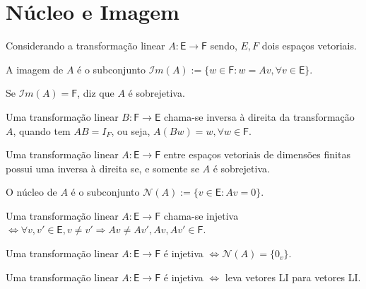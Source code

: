 \documentclass[10pt,a4paper]{article}
\begin{document}
\section{Núcleo e Imagem}

Considerando a transformação linear $A: \textsf{E} \rightarrow \textsf{F}$ sendo, $E, F$ dois espaços vetoriais.

\begin{definition}
	A imagem de $A$ é o subconjunto $\mathcal{I}m(A)  := \{ w \in \textsf{F} : w = Av, \forall v \in \textsf{E}\}$.
\end{definition}


\begin{definition}
	Se $\mathcal{I}m(A) = \textsf{F}$, diz que $A$ é sobrejetiva.
\end{definition}


\begin{definition}
	Uma transformação linear $B: \textsf{F} \rightarrow \textsf{E}$ chama-se inversa à direita da transformação $A$, quando tem $AB = I_F$, ou seja, $A(Bw) = w, \forall w \in \textsf{F}$.
\end{definition}


\begin{theorem}
	Uma transformação linear $A: \textsf{E} \rightarrow \textsf{F}$ entre espaços vetoriais de dimensões finitas possui uma inversa à direita se, e somente se $A$ é sobrejetiva.
\end{theorem}

\begin{definition}
	O núcleo de $A$ é o subconjunto $\mathcal{N}(A)  := \{ v \in \textsf{E} : Av = 0\}$.
\end{definition}

\begin{definition}
	Uma transformação linear $A: \textsf{E} \rightarrow \textsf{F}$ chama-se injetiva $\Leftrightarrow \forall v,v' \in \textsf{E}, v \neq v' \Rightarrow Av \neq Av', Av, Av' \in \textsf{F}$.
\end{definition}

\begin{theorem}
	Uma transformação linear $A: \textsf{E} \rightarrow \textsf{F}$ é injetiva $\Leftrightarrow \mathcal{N}(A) = \{ 0_v \}$.
\end{theorem}

\begin{theorem}
	Uma transformação linear $A: \textsf{E} \rightarrow \textsf{F}$ é injetiva $\Leftrightarrow$ leva vetores LI para vetores LI.
\end{theorem}
\end{document}
